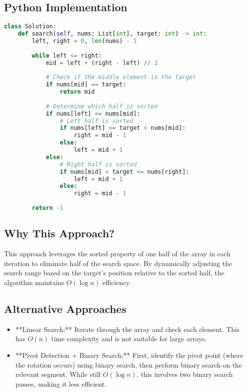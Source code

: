 \subsection*{Python Implementation}
\begin{fullwidth}
\begin{lstlisting}[language=Python]
class Solution:
    def search(self, nums: List[int], target: int) -> int:
        left, right = 0, len(nums) - 1
        
        while left <= right:
            mid = left + (right - left) // 2
            
            # Check if the middle element is the target
            if nums[mid] == target:
                return mid
            
            # Determine which half is sorted
            if nums[left] <= nums[mid]:
                # Left half is sorted
                if nums[left] <= target < nums[mid]:
                    right = mid - 1
                else:
                    left = mid + 1
            else:
                # Right half is sorted
                if nums[mid] < target <= nums[right]:
                    left = mid + 1
                else:
                    right = mid - 1
        
        return -1
\end{lstlisting}
\end{fullwidth}

\subsection*{Why This Approach?}
This approach leverages the sorted property of one half of the array in each iteration to eliminate half of the search space. By dynamically adjusting the search range based on the target's position relative to the sorted half, the algorithm maintains \(O(\log n)\) efficiency.

\subsection*{Alternative Approaches}
\begin{itemize}
    \item **Linear Search:**  
    Iterate through the array and check each element. This has \(O(n)\) time complexity and is not suitable for large arrays.
    \item **Pivot Detection + Binary Search:**  
    First, identify the pivot point (where the rotation occurs) using binary search, then perform binary search on the relevant segment. While still \(O(\log n)\), this involves two binary search passes, making it less efficient.
\end{itemize}

